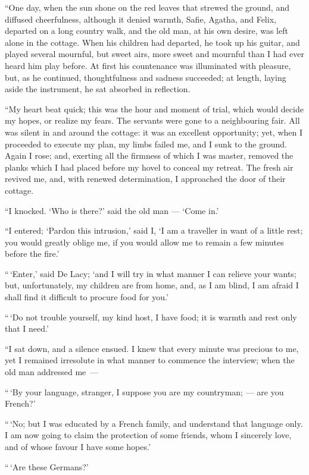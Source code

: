 ``One day, when the sun shone on
the red leaves that strewed the ground,
and diffused cheerfulness, although it
denied warmth, Safie, Agatha, and Felix,
departed on a long country walk,
and the old man, at his own desire, was
left alone in the cottage. When his
children had departed, he took up his
guitar, and played several mournful,
but sweet airs, more sweet and mournful
than I had ever heard him play before.
At first his countenance was illuminated
with pleasure, but, as he
continued, thoughtfulness and sadness
succeeded; at length, laying aside the
instrument, he sat absorbed in reflection.

``My heart beat quick; this was the
hour and moment of trial, which would
decide my hopes, or realize my fears.
The servants were gone to a neighbouring
fair. All was silent in and around
the cottage: it was an excellent opportunity;
yet, when I proceeded to execute
my plan, my limbs failed me, and
I sunk to the ground. Again I rose;
and, exerting all the firmness of which
I was master, removed the planks which
I had placed before my hovel to conceal
my retreat. The fresh air revived me,
and, with renewed determination, I approached
the door of their cottage.

``I knocked. `Who is there?' said
the old man --- `Come in.'

``I entered; `Pardon this intrusion,'
said I, `I am a traveller in want of a
little rest; you would greatly oblige me,
if you would allow me to remain a few
minutes before the fire.'

``\,`Enter,' said De Lacy; `and I will
try in what manner I can relieve your
wants; but, unfortunately, my children
are from home, and, as I am blind, I
am afraid I shall find it difficult to procure
food for you.'

``\,`Do not trouble yourself, my kind
host, I have food; it is warmth and
rest only that I need.'

``I sat down, and a silence ensued.
I knew that every minute was precious
to me, yet I remained irresolute in what
manner to commence the interview;
when the old man addressed me~---

``\,`By your language, stranger, I
suppose you are my countryman; --- are
you French?'

``\,`No; but I was educated by a
French family, and understand that
language only. I am now going to
claim the protection of some friends,
whom I sincerely love, and of whose
favour I have some hopes.'

``\,`Are these Germans?'

